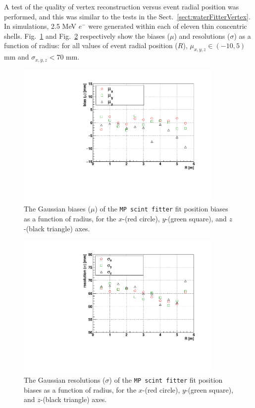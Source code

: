A test of the quality of vertex reconstruction versus event radial position was performed, and this was similar to the tests in the Sect.~\ref{sect:waterFitterVertex}. In simulations, 2.5 MeV $e^-$ were generated within each of eleven thin concentric shells. Fig.~\ref{fig:scintShellVsBias} and Fig.~\ref{fig:scintShellVsResol} respectively show the biases ($\mu$) and resolutions ($\sigma$) as a function of radius: for all values of event radial position ($R$), $\mu_{x,y,z}\in(-10,5)$ mm and $\sigma_{x,y,z} < 70$ mm. 

\begin{figure}[!htb]
	\centering
	\includegraphics[width=10cm]{shellTestScintFitter_RvsBias.pdf}
	\caption[The Gaussian means ($\mu$) of the \texttt{MP scint fitter} fit position biases as a function of radius.]{The Gaussian biases ($\mu$) of the \texttt{MP scint fitter} fit position biases as a function of radius, for the $x$-(red circle), $y$-(green square), and $z$-(black triangle) axes.}
	\label{fig:scintShellVsBias}
\end{figure}

\begin{figure}[!htb]
	\centering
	\includegraphics[width=10cm]{shellTestScintFitter_RvsResol.pdf}
	\caption[The Gaussian resolutions ($\sigma$) of the \texttt{MP scint fitter} fit position biases as a function of radius.]{The Gaussian resolutions ($\sigma$) of the \texttt{MP scint fitter} fit position biases as a function of radius, for the $x$-(red circle), $y$-(green square), and $z$-(black triangle) axes.}
	\label{fig:scintShellVsResol}
\end{figure}

